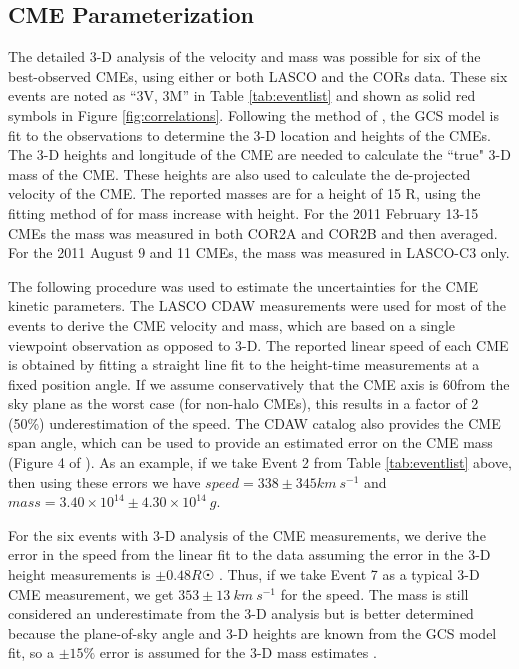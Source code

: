 \subsection{CME Parameterization}
The detailed 3-D analysis of the velocity and mass was possible for six of the best-observed CMEs, using either or both LASCO and the CORs data. These six events are noted as “3V, 3M” in Table \ref{tab:eventlist} and shown as solid red symbols in Figure \ref{fig:correlations}. Following the method of \citet{Colaninno2009}, the GCS model is fit to the observations to determine the 3-D location and heights of the CMEs. The 3-D heights and longitude of the CME are needed to calculate the ``true" 3-D mass of the CME. These heights are also used to calculate the de-projected velocity of the CME. The reported masses are for a height of 15 R\astrosun, using the fitting method of \citet{Bein2013} for mass increase with height. For the 2011 February 13-15 CMEs the mass was measured in both COR2A and COR2B and then averaged. For the 2011 August 9 and 11 CMEs, the mass was measured in LASCO-C3 only.

The following procedure was used to estimate the uncertainties for the CME kinetic parameters. The LASCO CDAW measurements were used for most of the events to derive the CME velocity and mass, which are based on a single viewpoint observation as opposed to 3-D. The reported linear speed of each CME is obtained by fitting a straight line fit to the height-time measurements at a fixed position angle. If we assume conservatively that the CME axis is 60\degree from the sky plane as the worst case (for non-halo CMEs), this results in a factor of 2 (50\%) underestimation of the speed. The CDAW catalog also provides the CME span angle, which can be used to provide an estimated error on the CME mass (Figure 4 of \citealt{Vourlidas2010}). As an example, if we take Event 2 from Table \ref{tab:eventlist} above, then using these errors we have $speed = 338 \pm 345 km\ s^{-1}$ and $mass = 3.40 \times 10^{14} \pm 4.30 \times 10^{14}\ g$. 

For the six events with 3-D analysis of the CME measurements, we derive the error in the speed from the linear fit to the data assuming the error in the 3-D height measurements is $\pm 0.48 R\astrosun$ \citep{Colaninno2013}. Thus, if we take Event 7 as a typical 3-D CME measurement, we get $353 \pm 13\ km\ s^{-1}$ for the speed. The mass is still considered an underestimate from the 3-D analysis but is better determined because the plane-of-sky angle and 3-D heights are known from the GCS model fit, so a $\pm 15\%$ error is assumed for the 3-D mass estimates \citep{Bein2013}.

